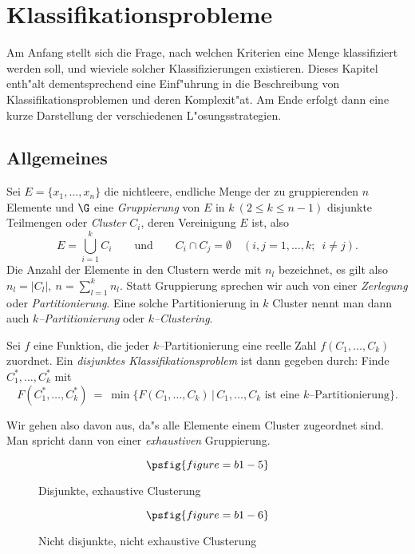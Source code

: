 \chapter{Klassifikationsprobleme}
Am Anfang stellt sich die Frage, nach welchen Kriterien eine Menge
klassifiziert werden soll, und wieviele solcher Klassifizierungen
existieren.
Dieses Kapitel enth"alt dementsprechend eine Einf"uhrung in die Beschreibung von
Klassifikationsproblemen und deren Komplexit"at.
Am Ende erfolgt dann eine kurze Darstellung der verschiedenen
L"osungsstrategien.

\section{Allgemeines}
\begin{bezeichnung}
Sei $E = \{x_1,\dots,x_n\}$ die nichtleere, endliche Menge der zu 
gruppierenden $n$ Elemente und $\G$ eine {\em Gruppierung}
von $E$ in $k\ (2 \leq k \leq n-1)$
disjunkte Teilmengen oder {\em Cluster} $C_i$, deren Vereinigung
$E$ ist, also
\[ E =\bigcup_{i=1}^k C_i \qquad \mbox{und} \qquad 
        C_i \cap C_j = \emptyset \quad
        ( i,j = 1,\dots,k; \enspace i \neq j). \]
Die Anzahl der Elemente in den Clustern werde mit $n_l$ bezeichnet, 
es gilt also $n_l = |C_l|,\  n = \sum_{l=1}^k n_l$.
Statt Gruppierung sprechen wir auch von einer {\em Zerlegung}
oder {\em Partitionierung}.
Eine solche Partitionierung in $k$ Cluster nennt man dann auch
{\em $k$--Partitionierung} oder {\em $k$--Clustering}.
\end{bezeichnung}

\begin{definition}
Sei $f$ eine Funktion, die jeder $k$--Partitionierung eine reelle Zahl
$f(C_1,\dots,C_k)$ zuordnet. Ein {\em disjunktes Klassifikationsproblem} ist 
dann gegeben durch: Finde $C_1^*,\dots,C_k^*$ mit
\[ F(C_1^*,\dots,C_k^*) \ = \ \min\{F(C_1,\dots,C_k) \, | \, C_1,\dots,C_k
	\mbox{ ist eine $k$--Partitionierung} \}.\]
\end{definition}

Wir gehen also davon aus, da"s alle Elemente einem Cluster zugeordnet sind.
Man spricht dann von einer {\em exhaustiven} Gruppierung.

\begin{figure}[htbp]
\[\psfig{figure=b1-5}\]
\caption{Disjunkte, exhaustive Clusterung}
\end{figure}

\begin{figure}[htbp]
\[\psfig{figure=b1-6}\]
\caption{Nicht disjunkte, nicht exhaustive Clusterung}
\end{figure}

